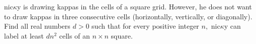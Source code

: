 nic$\kappa$y is drawing kappas in the cells of a square grid. However, he does not want to draw kappas in three consecutive cells (horizontally, vertically, or diagonally). Find all real numbers $d>0$ such that for every positive integer $n,$ nic$\kappa$y can label at least $dn^2$ cells of an $n\times n$ square.

